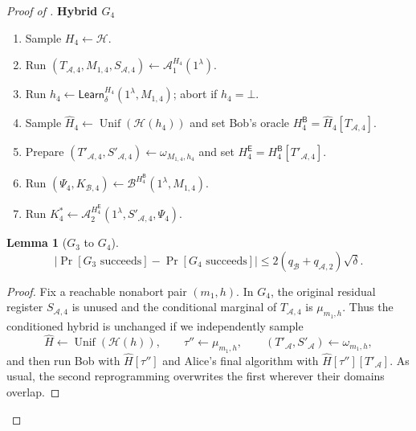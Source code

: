 \documentclass[11pt]{article}
\newcounter{algorithm}
\newtheorem{lemma}[lemma]{Lemma}
\newcommand{\cA}{\mathcal{A}}
\newcommand{\cB}{\mathcal{B}}
\newcommand{\cH}{\mathcal{H}}
\newcommand{\Unif}{\operatorname{Unif}}
\newcommand{\Learn}{\mathsf{Learn}}
\newcommand{\changed}[1]{\textcolor{purple!75!black}{#1}}
\newenvironment{hybrid}[1]{%
  \par\medskip
  \noindent\textbf{#1}
  \begin{enumerate}[leftmargin=2.5em,label=\arabic*.,itemsep=0.25em,topsep=0.35em]
}{%
  \end{enumerate}
  \medskip
}
\begin{document}
\begin{proof}[Proof of ]
\begin{hybrid}{Hybrid \(G_4\)}
  \item Sample \(H_4\leftarrow\cH\).
  \item Run
  \((T_{\cA,4},M_{1,4},S_{\cA,4})
  \leftarrow\cA_1^{H_4}(1^\lambda)\).
  \item Run
  \(h_4\leftarrow\Learn_\delta^{H_4}(1^\lambda,M_{1,4})\); abort if
  \(h_4=\bot\).
  \item \changed{Sample
  \(\widehat H_4\leftarrow\Unif(\cH(h_4))\) and set Bob's oracle
  \(H^{\mathsf B}_4=\widehat H_4[T_{\cA,4}]\).}
  \item Prepare
  \((T'_{\cA,4},S'_{\cA,4})\leftarrow\omega_{M_{1,4},h_4}\) and set
  \(H^{\mathsf E}_4=H^{\mathsf B}_4[T'_{\cA,4}]\).
  \item Run
  \((\Psi_4,K_{\cB,4})
  \leftarrow\cB^{H^{\mathsf B}_4}(1^\lambda,M_{1,4})\).
  \item Run
  \(K^*_4
  \leftarrow\cA_2^{H^{\mathsf E}_4}
  (1^\lambda,S'_{\cA,4},\Psi_4)\).
\end{hybrid}

\begin{lemma}[\(G_3\) to \(G_4\)]\label{lem:g3-g4}
\[
  \left|
  \Pr[G_3\text{ succeeds}]
  -
  \Pr[G_4\text{ succeeds}]
  \right|
  \le 2(q_{\cB}+q_{\cA,2})\sqrt\delta.
\]
\end{lemma}

\begin{proof}
Fix a reachable nonabort pair \((m_1,h)\). In \(G_4\), the original
residual register \(S_{\cA,4}\) is unused and the conditional marginal of
\(T_{\cA,4}\) is \(\mu_{m_1,h}\). Thus the conditioned hybrid is unchanged
if we independently sample
\[
  \widehat H\leftarrow\Unif(\cH(h)),
  \qquad
  \tau''\leftarrow\mu_{m_1,h},
  \qquad
  (T'_{\cA},S'_{\cA})\leftarrow\omega_{m_1,h},
\]
and then run Bob with \(\widehat H[\tau'']\) and Alice's final algorithm with
\(\widehat H[\tau''][T'_{\cA}]\). As usual, the second reprogramming
overwrites the first wherever their domains overlap.


\end{proof}
\end{proof}
\end{document}
